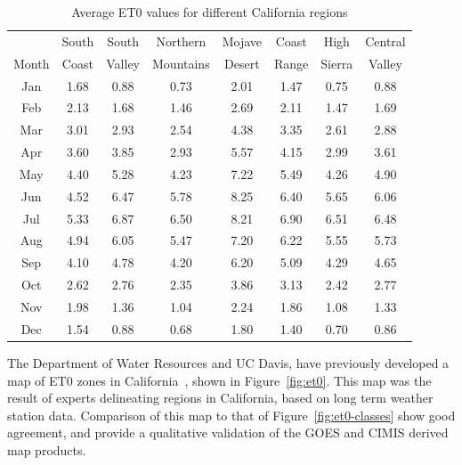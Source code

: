 \documentclass{elsart}
\begin{document}
\begin{table}
  \centering
  \caption{Average \ac{ET0} values for different California regions}
  \begin{tabular}{c|c|c|c|c|c|c|c}
& South & South & Northern & Mojave & Coast & High & Central \\
Month & Coast & Valley & Mountains & Desert & Range & Sierra & Valley \\
\hline \hline
Jan & 1.68 & 0.88 & 0.73 & 2.01 & 1.47 & 0.75 & 0.88 \\
Feb & 2.13 & 1.68 & 1.46 & 2.69 & 2.11 & 1.47 & 1.69 \\
Mar & 3.01 & 2.93 & 2.54 & 4.38 & 3.35 & 2.61 & 2.88 \\
Apr & 3.60 & 3.85 & 2.93 & 5.57 & 4.15 & 2.99 & 3.61 \\
May & 4.40 & 5.28 & 4.23 & 7.22 & 5.49 & 4.26 & 4.90 \\
Jun & 4.52 & 6.47 & 5.78 & 8.25 & 6.40 & 5.65 & 6.06 \\
Jul & 5.33 & 6.87 & 6.50 & 8.21 & 6.90 & 6.51 & 6.48 \\
Aug & 4.94 & 6.05 & 5.47 & 7.20 & 6.22 & 5.55 & 5.73 \\
Sep & 4.10 & 4.78 & 4.20 & 6.20 & 5.09 & 4.29 & 4.65 \\
Oct & 2.62 & 2.76 & 2.35 & 3.86 & 3.13 & 2.42 & 2.77 \\
Nov & 1.98 & 1.36 & 1.04 & 2.24 & 1.86 & 1.08 & 1.33 \\
Dec & 1.54 & 0.88 & 0.68 & 1.80 & 1.40 & 0.70 & 0.86 \\    
  \end{tabular}
  \label{tab:et0-classes}
\end{table}

The Department of Water Resources and UC Davis, have previously
developed a map of \ac{ET0} zones in
California~\citep{cimis99calif-refer}, shown in Figure~\ref{fig:et0}.
This map was the result of experts delineating regions in California,
based on long term weather station data.  Comparison of this map to
that of Figure~\ref{fig:et0-classes} show good agreement, and provide
a qualitative validation of the \ac{GOES} and \ac{CIMIS} derived map
products.
\end{document}
